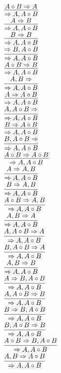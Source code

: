 \documentclass[11pt]{article}
\begin{document}
\begin{center}
\bigskip
\\$\infer{\Rightarrow A, A\circ B}{A\circ B\Rightarrow A}$
\bigskip
\\$\infer{\Rightarrow A, A\circ B}{A\Rightarrow B}$
\bigskip
\\$\infer{\Rightarrow A, A\circ B}{B\Rightarrow B}$
\bigskip
\\$\infer{\Rightarrow A, A\circ B}{\Rightarrow B, A\circ B}$
\bigskip
\\$\infer{\Rightarrow A, A\circ B}{A\circ B\Rightarrow B}$
\bigskip
\\$\infer{\Rightarrow A, A\circ B}{A, B\Rightarrow }$
\bigskip
\\$\infer{\Rightarrow A, A\circ B}{A\Rightarrow A\circ B}$
\bigskip
\\$\infer{\Rightarrow A, A\circ B}{A, A\circ B\Rightarrow }$
\bigskip
\\$\infer{\Rightarrow A, A\circ B}{B\Rightarrow A\circ B}$
\bigskip
\\$\infer{\Rightarrow A, A\circ B}{B, A\circ B\Rightarrow }$
\bigskip
\\$\infer{\Rightarrow A, A\circ B}{A\circ B\Rightarrow A\circ B}$
\bigskip
\\$\infer{\Rightarrow A, A\circ B}{A\Rightarrow A, B}$
\bigskip
\\$\infer{\Rightarrow A, A\circ B}{B\Rightarrow A, B}$
\bigskip
\\$\infer{\Rightarrow A, A\circ B}{A\circ B\Rightarrow A, B}$
\bigskip
\\$\infer{\Rightarrow A, A\circ B}{A, B\Rightarrow A}$
\bigskip
\\$\infer{\Rightarrow A, A\circ B}{A, A\circ B\Rightarrow A}$
\bigskip
\\$\infer{\Rightarrow A, A\circ B}{B, A\circ B\Rightarrow A}$
\bigskip
\\$\infer{\Rightarrow A, A\circ B}{A, B\Rightarrow B}$
\bigskip
\\$\infer{\Rightarrow A, A\circ B}{A\Rightarrow B, A\circ B}$
\bigskip
\\$\infer{\Rightarrow A, A\circ B}{A, A\circ B\Rightarrow B}$
\bigskip
\\$\infer{\Rightarrow A, A\circ B}{B\Rightarrow B, A\circ B}$
\bigskip
\\$\infer{\Rightarrow A, A\circ B}{B, A\circ B\Rightarrow B}$
\bigskip
\\$\infer{\Rightarrow A, A\circ B}{A\circ B\Rightarrow B, A\circ B}$
\bigskip
\\$\infer{\Rightarrow A, A\circ B}{A, B\Rightarrow A\circ B}$

\end{center}
\end{document}
